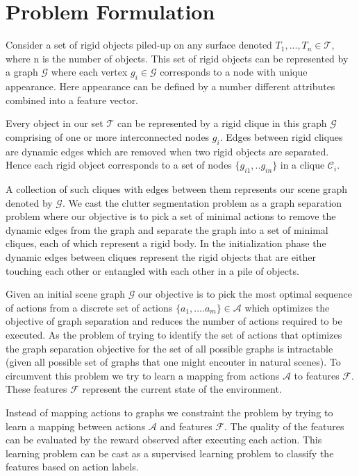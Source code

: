 \section{Problem Formulation}
\label{sec:problem}
Consider a set of rigid objects piled-up on any surface denoted $T_1,...,T_n \in \mathcal{T}$, where n is the number of objects. This set of rigid objects can be represented by a graph $\mathcal{G}$ where each vertex $g_i \in \mathcal{G}$ corresponds to a node with unique appearance. Here appearance can be defined by a number different attributes combined into a feature vector.

Every object in our set $\mathcal{T}$ can be represented by a rigid clique in this graph $\mathcal{G}$ comprising of one or more interconnected nodes $g_i$. Edges between rigid cliques are dynamic edges which are removed when two rigid objects are separated. Hence each rigid object corresponds to a set of nodes $\{g_{i1},..g_{in}\}$ in a clique $\mathcal{C}_i$. 

A collection of such cliques with edges between them represents our scene graph denoted by $\mathcal{G}$. We cast the clutter segmentation problem as a graph separation problem where our objective is to pick a set of minimal actions to remove the dynamic edges from the graph and separate the graph into a set of minimal cliques, each of which represent a rigid body. In the initialization phase the dynamic edges between cliques represent the rigid objects that are either touching each other or entangled with each other in a pile of objects.

Given an initial scene graph $\mathcal{G}$ our objective is to pick the most optimal sequence of actions from a discrete set of actions $\{a_1,....a_m\} \in \mathcal{A}$ which optimizes the objective of graph separation and reduces the number of actions required to be executed. As the problem of trying to identify the set of actions that optimizes the graph separation objective for the set of all possible graphs is intractable (given all possible set of graphs that one might encouter in natural scenes). To circumvent this problem we try to learn a mapping from actions $\mathcal{A}$ to features $\mathcal{F}$. These features $\mathcal{F}$ represent the current state of the environment. 

Instead of mapping actions to graphs we constraint the problem by trying to learn a mapping between actions $\mathcal{A}$ and features $\mathcal{F}$. The quality of the features can be evaluated by the reward observed after executing each action. This learning problem can be cast as a supervised learning problem to classify the features based on action labels. 


